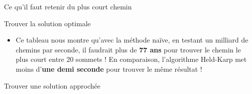 \begin{frame}{Ce qu'il faut retenir du plus court chemin}
\begin{block}{Trouver la solution optimale}
\begin{itemize}
      \bigskip

      \item Ce tableau nous montre qu'avec la méthode naïve, en testant un milliard de chemins par seconde, il faudrait plus de \textbf{77 ans} pour trouver le chemin le plus court entre 20 sommets ! En comparaison, l'algorithme Held-Karp met moins d'\textbf{une demi seconde} pour trouver le même résultat !
    \end{itemize}
  \end{block}

  \begin{block}{Trouver une solution approchée}


  \end{block}


\end{frame}
